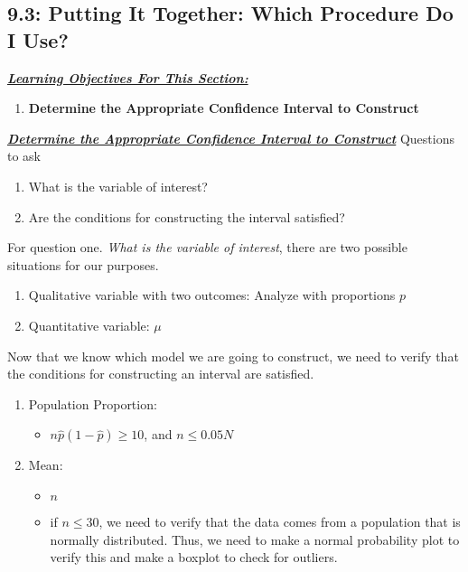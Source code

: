\documentclass{report}
\begin{document}
    \subsection{9.3: Putting It Together: Which Procedure Do I Use?}
    \bigbreak \noindent 
    \textbf{\textit{\underline{Learning Objectives For This Section:}}}
    \begin{enumerate}
        \item \textbf{Determine the Appropriate Confidence Interval to Construct}
    \end{enumerate}
    \bigbreak \noindent \bigbreak \noindent 
    \textbf{\textit{\underline{Determine the Appropriate Confidence Interval to Construct}}}
    \bigbreak \noindent 
    Questions to ask
    \begin{enumerate}
        \item What is the variable of interest? 
        \item Are the conditions for constructing the interval satisfied?
    \end{enumerate}
    \bigbreak \noindent 
    For question one. \textit{What is the variable of interest}, there are two possible situations for our purposes.
    \begin{enumerate}
        \item Qualitative variable with two outcomes: Analyze with proportions $p$
        \item Quantitative variable: $\mu $
    \end{enumerate}
    \bigbreak \noindent 
    Now that we know which model we are going to construct, we need to verify that the conditions for constructing an interval are satisfied.
    \begin{enumerate}
        \item Population Proportion:
            \begin{itemize}
                \item $n\hat{p}(1-\hat{p}) \geq 10 $, and $n \leq 0.05N$
            \end{itemize}
        \item Mean:
            \begin{itemize}
                \item $n $
                \item if $n \leq 30 $, we need to verify that the data comes from a population that is normally distributed. Thus, we need to make a normal probability plot to verify this and make a boxplot to check for outliers.
            \end{itemize}
    \end{enumerate}























     

    
\end{document}
